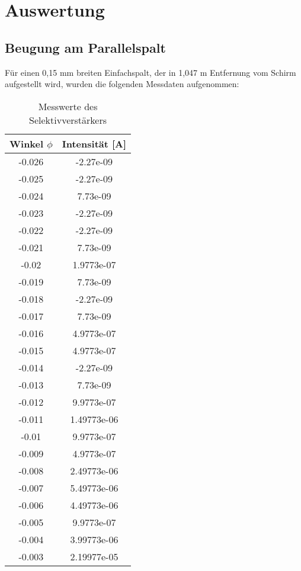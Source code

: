 \section{Auswertung}
\label{sec:Auswertung}

\subsection{Beugung am Parallelspalt}
  Für einen 0,15 mm breiten Einfachspalt, der in 1,047 m Entfernung vom Schirm aufgestellt
  wird, wurden die folgenden Messdaten aufgenommen:
  \begin{table}[H]
  \centering
  \caption{Messwerte des Selektivverstärkers}
  \label{tab:mag}
  \begin{tabular}{c c}
   \toprule
    Winkel $\phi$ & Intensität [A]\\
   \midrule
   -0.026     & -2.27e-09    \\
 -0.025       & -2.27e-09    \\
 -0.024       &  7.73e-09    \\
 -0.023       & -2.27e-09    \\
 -0.022       & -2.27e-09    \\
 -0.021       &  7.73e-09    \\
 -0.02        &  1.9773e-07  \\
 -0.019       &  7.73e-09    \\
 -0.018       & -2.27e-09    \\
 -0.017       &  7.73e-09    \\
 -0.016       &  4.9773e-07  \\
 -0.015       &  4.9773e-07  \\
 -0.014       & -2.27e-09    \\
 -0.013       &  7.73e-09    \\
 -0.012       &  9.9773e-07  \\
 -0.011       &  1.49773e-06 \\
 -0.01        &  9.9773e-07  \\
 -0.009       &  4.9773e-07  \\
 -0.008       &  2.49773e-06 \\
 -0.007       &  5.49773e-06 \\
 -0.006       &  4.49773e-06 \\
 -0.005       &  9.9773e-07  \\
 -0.004       &  3.99773e-06 \\
 -0.003       &  2.19977e-05 \\

\end{tabular}
\end{table}
